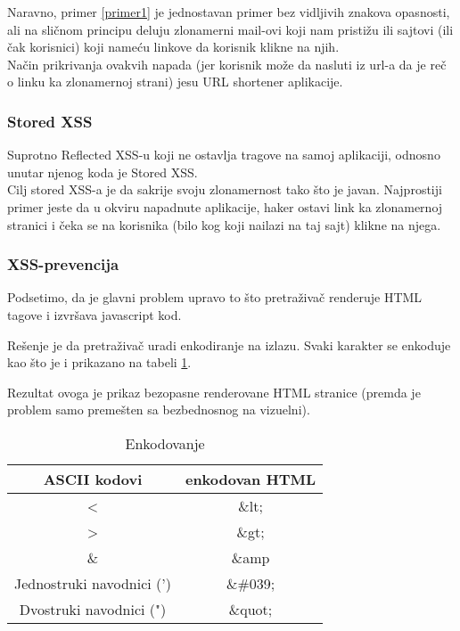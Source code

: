 \documentclass[a4paper]{article}
\begin{document}
 Naravno, primer \ref{primer1} je jednostavan primer bez vidljivih znakova opasnosti, ali na sli\v{c}nom principu deluju zlonamerni mail-ovi koji nam pristi\v{z}u ili sajtovi (ili \v{c}ak korisnici) koji name\'{c}u linkove da korisnik klikne na njih.\\
Na\v{c}in prikrivanja ovakvih napada (jer korisnik mo\v{z}e da nasluti iz url-a da je re\v{c} o linku ka zlonamernoj strani) jesu URL shortener aplikacije.
\subsubsection{Stored XSS}
Suprotno Reflected XSS-u koji ne ostavlja tragove na samoj aplikaciji, odnosno unutar njenog koda je Stored XSS.\\ Cilj stored XSS-a je da sakrije svoju zlonamernost tako \v{s}to je javan. Najprostiji primer jeste da u okviru napadnute aplikacije, haker ostavi link ka zlonamernoj stranici i \v{c}eka se na korisnika (bilo kog koji nailazi na taj sajt) klikne na njega.
\subsubsection{XSS-prevencija}
Podsetimo, da je glavni problem upravo to \v{s}to pretra\v{z}iva\v{c} renderuje HTML tagove i izvr\v{s}ava javascript kod.  

Re\v{s}enje je da pretra\v{z}iva\v{c} uradi enkodiranje na izlazu. Svaki karakter se enkoduje kao \v{s}to je i prikazano na tabeli \ref{kodiranje}.

Rezultat ovoga je prikaz bezopasne renderovane HTML stranice (premda je problem samo preme\v{s}ten sa bezbednosnog na vizuelni).

\begin{table}[ht]

\begin{center}
\caption{Enkodovanje}
\begin{tabular}{ | c | c | }
\hline
	\rowcolor{yellow}
\textbf{ASCII kodovi} & \textbf{enkodovan HTML} \\
	\hline
 < & \&lt; \\ 
 \hline
 > & \&gt; \\  
 \hline
 \& & \&amp \\
 \hline
 Jednostruki navodnici (') & \&\#039;\\
 \hline
 Dvostruki navodnici (") & \&quot;\\  
 \hline  
\end{tabular}

\label{kodiranje}
\end{center}
\end{table}
\end{document}

